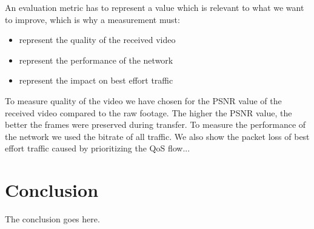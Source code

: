 \documentclass[conference]{IEEEtran}
\begin{document}
An evaluation metric has to represent a value which is relevant to what we want to improve, which is why a measurement must:
\begin{itemize}
	\item represent the quality of the received video
	\item represent the performance of the network
	\item represent the impact on best effort traffic
\end{itemize}
To measure quality of the video we have chosen for the PSNR value of the received video compared to the raw footage. The higher the PSNR value, the better the frames were preserved during transfer. To measure the performance of the network we used the bitrate of all traffic. We also show the packet loss of best effort traffic caused by prioritizing the QoS flow...

\section{Conclusion}
The conclusion goes here.







%
%
\end{document}

